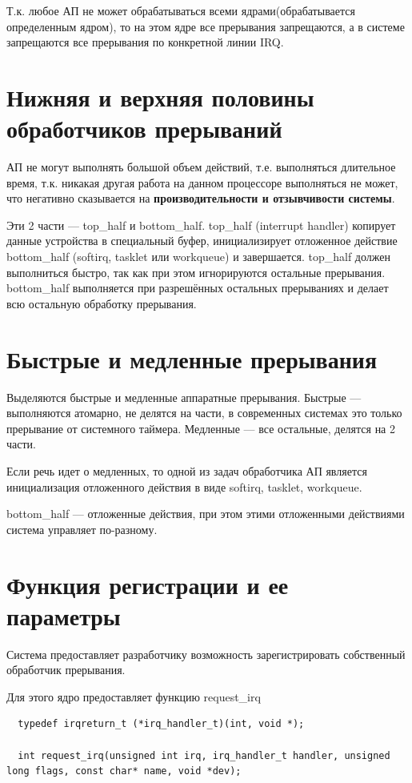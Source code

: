 Т.к. любое АП не может обрабатываться всеми ядрами(обрабатывается определенным ядром), то на этом ядре все прерывания запрещаются, а в системе запрещаются все прерывания по конкретной линии IRQ.

\section{Нижняя и верхняя половины обработчиков прерываний}

АП не могут выполнять большой объем действий, т.е. выполняться длительное время, т.к. никакая другая работа на данном процессоре выполняться не может, что негативно сказывается на \textbf{производительности и отзывчивости системы}.

Эти 2 части --- top\_half и bottom\_half. top\_half (interrupt handler) копирует данные устройства в специальный буфер, инициализирует отложенное действие bottom\_half (softirq, tasklet или workqueue) и завершается. top\_half должен выполниться быстро, так как при этом игнорируются остальные прерывания. bottom\_half выполняется при разрешённых остальных прерываниях и делает всю остальную обработку прерывания.

\section{Быстрые и медленные прерывания}

Выделяются быстрые и медленные аппаратные прерывания. Быстрые --- выполняются атомарно, не делятся на части, в современных системах это только прерывание от системного таймера. Медленные --- все остальные, делятся на 2 части.

Если речь идет о медленных, то одной из задач обработчика АП является инициализация отложенного действия в виде softirq, tasklet, workqueue.

bottom\_half --- отложенные действия, при этом этими отложенными действиями система управляет по-разному.

\section{Функция регистрации и ее параметры}

Система предоставляет разработчику возможность зарегистрировать собственный обработчик прерывания.

Для этого ядро предоставляет функцию request\_irq

\begin{lstlisting}
  typedef irqreturn_t (*irq_handler_t)(int, void *); 
  
  int request_irq(unsigned int irq, irq_handler_t handler, unsigned long flags, const char* name, void *dev);
\end{lstlisting}

